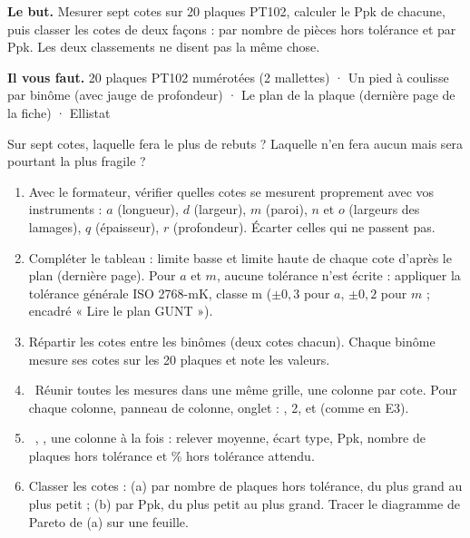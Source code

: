 \documentclass[10pt,a4paper]{article}
\begin{document}
\thispagestyle{fancy}
\begin{tcolorbox}[boite]\textbf{Le but.} Mesurer sept cotes sur 20 plaques PT102, calculer le Ppk de chacune, puis classer les cotes de deux façons : par nombre de pièces hors tolérance et par Ppk. Les deux classements ne disent pas la même chose.\par\textbf{Il vous faut.} 20 plaques PT102 numérotées (2 mallettes) · Un pied à coulisse par binôme (avec jauge de profondeur) · Le plan de la plaque (dernière page de la fiche) · Ellistat\end{tcolorbox}
\begin{tcolorbox}[pred]Sur sept cotes, laquelle fera le plus de rebuts ? Laquelle n'en fera aucun mais sera pourtant la plus fragile ?\reponse\end{tcolorbox}
\begin{enumerate}[label=\textcolor{cyan}{\textbf{\arabic*.}},leftmargin=15pt,itemsep=1.5pt]
\item Avec le formateur, vérifier quelles cotes se mesurent proprement avec vos instruments : $a$ (longueur), $d$ (largeur), $m$ (paroi), $n$ et $o$ (largeurs des lamages), $q$ (épaisseur), $r$ (profondeur). Écarter celles qui ne passent pas.
\item Compléter le tableau : limite basse et limite haute de chaque cote d'après le plan (dernière page). Pour $a$ et $m$, aucune tolérance n'est écrite : appliquer la tolérance générale ISO 2768-mK, classe m ($\pm 0{,}3$ pour $a$, $\pm 0{,}2$ pour $m$ ; encadré « Lire le plan GUNT »).
\item Répartir les cotes entre les binômes (deux cotes chacun). Chaque binôme mesure ses cotes sur les 20 plaques et note les valeurs.
\item \tagE\ Réunir toutes les mesures dans une même grille, une colonne par cote. Pour chaque colonne, panneau de colonne, onglet  : ,  2,  et  (comme en E3).
\item \tagE\ , , une colonne à la fois : relever moyenne, écart type, Ppk, nombre de plaques hors tolérance et \% hors tolérance attendu.
\item Classer les cotes : (a) par nombre de plaques hors tolérance, du plus grand au plus petit ; (b) par Ppk, du plus petit au plus grand. Tracer le diagramme de Pareto de (a) sur une feuille.
\end{enumerate}
\end{document}

